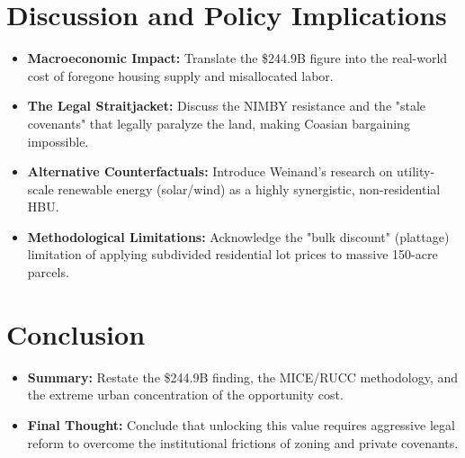 \documentclass[10pt, letterpaper]{article}
\begin{document}
\newpage

\section{Discussion and Policy Implications}
\begin{itemize}
    \item \textbf{Macroeconomic Impact:} Translate the \$244.9B figure into the real-world cost of foregone housing supply and misallocated labor.
    \item \textbf{The Legal Straitjacket:} Discuss the NIMBY resistance and the "stale covenants" that legally paralyze the land, making Coasian bargaining impossible.
    \item \textbf{Alternative Counterfactuals:} Introduce Weinand's research on utility-scale renewable energy (solar/wind) as a highly synergistic, non-residential HBU.
    \item \textbf{Methodological Limitations:} Acknowledge the "bulk discount" (plattage) limitation of applying subdivided residential lot prices to massive 150-acre parcels.
\end{itemize}

\section{Conclusion}
\begin{itemize}
    \item \textbf{Summary:} Restate the \$244.9B finding, the MICE/RUCC methodology, and the extreme urban concentration of the opportunity cost.
    \item \textbf{Final Thought:} Conclude that unlocking this value requires aggressive legal reform to overcome the institutional frictions of zoning and private covenants.
\end{itemize}

\newpage

\printbibliography[title={References}]
\end{document}
